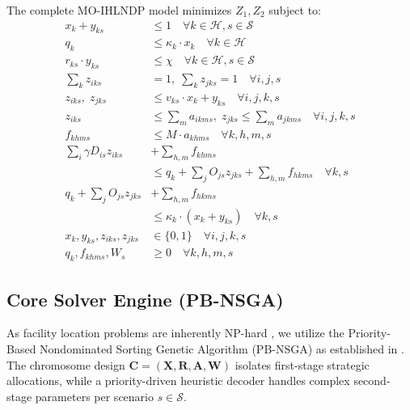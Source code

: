 \documentclass[conference]{IEEEtran}
\begin{document}
The complete MO-IHLNDP model minimizes $Z_1, Z_2$ subject to:
\allowdisplaybreaks
\begin{align}
    x_k + y_{ks} & \le 1 \quad \forall k \in \mathcal{H}, s \in \mathcal{S} \label{eq:hub_type} \\
    q_k & \le \kappa_k \cdot x_k \quad \forall k \in \mathcal{H} \label{eq:hub_inv_cap} \\
    r_{ks} \cdot y_{ks} & \le \chi \quad \forall k \in \mathcal{H}, s \in \mathcal{S} \label{eq:hub_safety} \\
    \sum_k z_{iks} & = 1,\; \sum_k z_{jks} = 1 \quad \forall i, j, s \label{eq:single_alloc_demand} \\
    z_{iks},\; z_{jks} & \le v_{ks} \cdot x_k + y_{ks} \quad \forall i,j,k,s \label{eq:valid_assign_demand} \\
    z_{iks} & \le \textstyle\sum_m a_{ikms},\; z_{jks} \le \textstyle\sum_m a_{jkms} \quad \forall i,j,k,s \label{eq:path_demand} \\
    f_{khms} & \le M \cdot a_{khms} \quad \forall k, h, m, s \label{eq:trans_path} \\
    \sum_i \gamma D_{is} z_{iks} & + \sum_{h,m} f_{khms} \nonumber \\ 
    & \le q_k + \sum_j O_{js} z_{jks} + \sum_{h,m} f_{hkms} \quad \forall k, s \label{eq:flow_balance} \\
    q_k + \sum_j O_{js} z_{jks} & + \sum_{h,m} f_{hkms} \nonumber \\
    & \le \kappa_k \cdot (x_k + y_{ks}) \quad \forall k, s \label{eq:throughput_cap} \\
    x_k, y_{ks}, z_{iks}, z_{jks} & \in \{0, 1\} \quad \forall i, j, k, s \label{eq:binary_vars} \\
    q_k, f_{khms}, W_s & \ge 0 \quad \forall k, h, m, s \label{eq:nonneg_vars}
\end{align}

\subsection{Core Solver Engine (PB-NSGA)}
As facility location problems are inherently NP-hard \cite{mirchandani1990discrete}, we utilize the Priority-Based Nondominated Sorting Genetic Algorithm (PB-NSGA) \cite{deb2002fast} as established in \cite{letang2026humanitarian}. The chromosome design $\mathbf{C} = (\mathbf{X}, \mathbf{R}, \mathbf{A}, \mathbf{W})$ isolates first-stage strategic allocations, while a priority-driven heuristic decoder handles complex second-stage parameters per scenario $s \in \mathcal{S}$.
\end{document}
